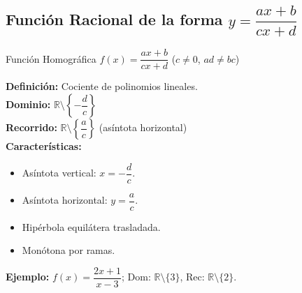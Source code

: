 \documentclass[12pt,a4paper]{article}
\begin{document}
\subsection{Función Racional de la forma $y=\dfrac{ax+b}{cx+d}$}
\begin{funcbox}{Función Homográfica $f(x)=\dfrac{ax+b}{cx+d}$ \quad ($c\neq 0$, $ad\neq bc$)}
\begin{minipage}[t]{0.55\textwidth}
    \textbf{Definición:} Cociente de polinomios lineales.\\
    \textbf{Dominio:} $\mathbb{R}\setminus\left\{-\dfrac{d}{c}\right\}$\\
    \textbf{Recorrido:} $\mathbb{R}\setminus\left\{\dfrac{a}{c}\right\}$ (asíntota horizontal)\\
    \textbf{Características:}
    \begin{itemize}
        \item Asíntota vertical: $x=-\dfrac{d}{c}$.
        \item Asíntota horizontal: $y=\dfrac{a}{c}$.
        \item Hipérbola equilátera trasladada.
        \item Monótona por ramas.
    \end{itemize}
    \textbf{Ejemplo:} $f(x)=\dfrac{2x+1}{x-3}$; Dom: $\mathbb{R}\setminus\{3\}$, Rec: $\mathbb{R}\setminus\{2\}$.
\end{minipage}\hfill
\begin{minipage}[t]{0.4\textwidth}
    \centering
\end{minipage}
\end{funcbox}

\end{document}
